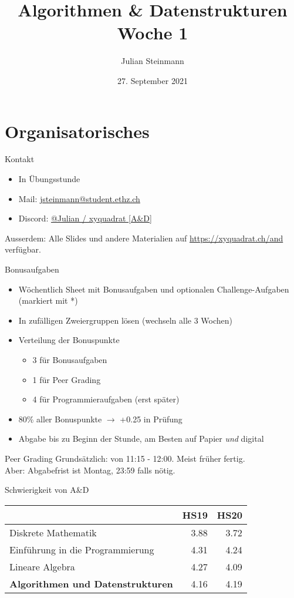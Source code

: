 \documentclass[aspectratio=169]{beamer}
\title{Algorithmen \& Datenstrukturen \\ Woche 1}
\date{27. September 2021}
\author{Julian Steinmann}
\institute{ETH Zürich}
\begin{document}
  \maketitle
  \section{Organisatorisches}
  \begin{frame}{Kontakt}
    \begin{itemize}
      \item In Übungsstunde
      \item Mail: \href{mailto:jsteinmann@student.ethz.ch}{jsteinmann@student.ethz.ch}
      \item Discord: \url{@Julian / xyquadrat [A&D]}
    \end{itemize}
    Ausserdem: Alle Slides und andere Materialien auf \href{https://xyquadrat.ch/and}{https://xyquadrat.ch/and} verfügbar.
  \end{frame}
  \begin{frame}{Bonusaufgaben}
    \begin{itemize}
      \item Wöchentlich Sheet mit Bonusaufgaben und optionalen Challenge-Aufgaben (markiert mit *)
      \item In zufälligen Zweiergruppen lösen (wechseln alle 3 Wochen)
      \item Verteilung der Bonuspunkte
      \begin{itemize}
        \item 3 für Bonusaufgaben
        \item 1 für Peer Grading
        \item 4 für Programmieraufgaben (erst später)
      \end{itemize}
      \item 80\% aller Bonuspunkte \(\rightarrow\) +0.25 in Prüfung
      \item Abgabe bis zu Beginn der Stunde, am Besten auf Papier \textit{und} digital
    \end{itemize}
  \end{frame}
  \begin{frame}{Peer Grading}
    Grundsätzlich: von 11:15 - 12:00. Meist früher fertig. \\
    Aber: Abgabefrist ist Montag, 23:59 falls nötig.
  \end{frame}
  \begin{frame}{Schwierigkeit von A\&D}
    \begin{center}
    \begin{tabular}{lrr}
      \toprule
      & HS19 & HS20 \\
      \midrule
      Diskrete Mathematik & 3.88 & 3.72 \\
      Einführung in die Programmierung & 4.31 & 4.24 \\
      Lineare Algebra & 4.27 & 4.09 \\
      \textbf{Algorithmen und Datenstrukturen} & 4.16 & 4.19 \\
      \bottomrule
    \end{tabular}
    \end{center}
  \end{frame}
\end{document}
